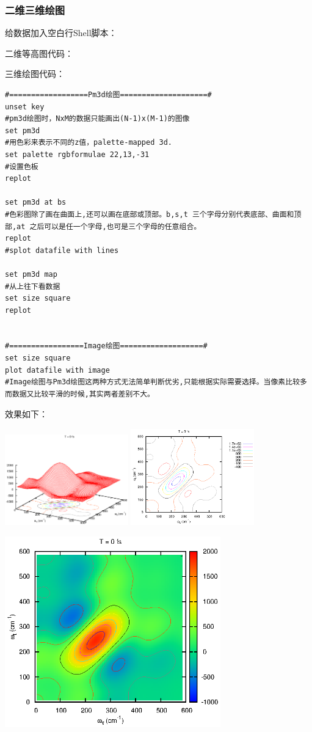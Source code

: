 \subsubsection{二维三维绘图}
给数据加入空白行Shell脚本：

二维等高图代码：

三维绘图代码：
\begin{lstlisting}[language=gnuplot]
#==================Pm3d绘图====================#
unset key
#pm3d绘图时，NxM的数据只能画出(N-1)x(M-1)的图像
set pm3d
#用色彩来表示不同的z值，palette-mapped 3d.
set palette rgbformulae 22,13,-31
#设置色板
replot

set pm3d at bs
#色彩图除了画在曲面上,还可以画在底部或顶部。b,s,t 三个字母分别代表底部、曲面和顶部,at 之后可以是任一个字母,也可是三个字母的任意组合。
replot
#splot datafile with lines

set pm3d map
#从上往下看数据
set size square
replot


#=================Image绘图===================#
set size square
plot datafile with image
#Image绘图与Pm3d绘图这两种方式无法简单判断优劣,只能根据实际需要选择。当像素比较多而数据又比较平滑的时候,其实两者差别不大。
\end{lstlisting}


效果如下：

\includegraphics[width=0.4\textwidth]{program/gnuplot/re_rp1.eps}
\includegraphics[width=0.4\textwidth]{program/gnuplot/re_rp2.eps}

\includegraphics[width=0.7\textwidth]{program/gnuplot/re_rp3.eps}

